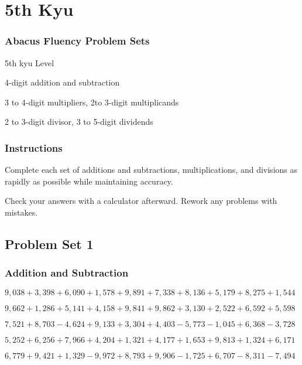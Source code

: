\hypertarget{th-kyu-3}{%
\section{5th Kyu}\label{th-kyu-3}}

\hypertarget{abacus-fluency-problem-sets-3}{%
\subsubsection{Abacus Fluency Problem
Sets}\label{abacus-fluency-problem-sets-3}}

5th kyu Level

4-digit addition and subtraction

3 to 4-digit multipliers, 2to 3-digit multiplicands

2 to 3-digit divisor, 3 to 5-digit dividends

\hypertarget{instructions-3}{%
\subsubsection{Instructions}\label{instructions-3}}

Complete each set of additions and subtractions, multiplications, and
divisions as rapidly as possible while maintaining accuracy.

Check your answers with a calculator afterward. Rework any problems with
mistakes.

\hypertarget{problem-set-1-3}{%
\subsection{Problem Set 1}\label{problem-set-1-3}}

\hypertarget{addition-and-subtraction-163}{%
\subsubsection{Addition and
Subtraction}\label{addition-and-subtraction-163}}

\(9,038+3,398+6,090+1,578+9,891+7,338+8,136+5,179+8,275+ 1,544\)

\(9,662+1,286+5,141+4,158+9,841+9,862+3,130+2,522+6,592+5,598\)

\(7,521+8,703-4,624+9,133+3,304+4,403-5,773-1,045+6,368-3,728\)

\(5,252+6,256+7,966+4,204+1,321+4,177+1,653+9,813+1,324+6,171\)

\(6,779+9,421+1,329-9,972+8,793+9,906-1,725+6,707-8,311-7,494\)

